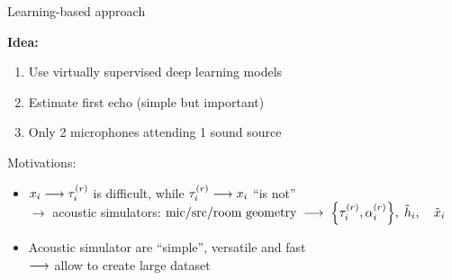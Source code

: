\begin{frame}{Learning-based approach \hfill\iconDNN}

    \begin{mycontriblock}
        \textbf{Idea:}
        \begin{enumerate}
            \item Use \alert{virtually} supervised \alert{deep} learning models
            \item Estimate first echo (simple but important) 
            \item Only 2 microphones attending 1 sound source
        \end{enumerate}
    \end{mycontriblock}

    \begin{block}{Motivations:}
        \begin{itemize}
            \item $x_i \longrightarrow \tau_i^{(r)}$ is difficult, while $\tau_i^{(r)} \longrightarrow x_i$ ``is not''
            \\$\rightarrow$ acoustic simulators:
                $\text{mic/src/room geometry}
                \; \longrightarrow \;
                \set{\tauir,\ampir}, \; \contRIR_i, \quad \contMic_i$
            \item Acoustic simulator are ``simple'', versatile and fast
            \\$\longrightarrow$ allow to create large dataset
        \end{itemize}
    \end{block}

\end{frame}


